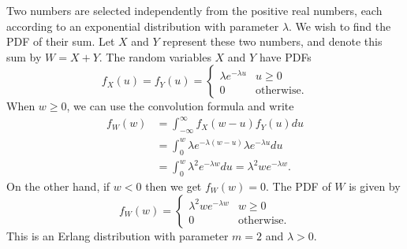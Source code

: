 \begin{example}
Two numbers are selected independently from the positive real numbers, each according to an exponential distribution with parameter $\lambda$. 
We wish to find the PDF of their sum.
Let $X$ and $Y$ represent these two numbers, and denote this sum by $W = X + Y$.
The random variables $X$ and $Y$ have PDFs
\begin{equation*}
f_X (u) = f_Y (u) = \begin{cases} \lambda e^{-\lambda u} & u \geq 0 \\
0 & \text{otherwise} . \end{cases}
\end{equation*}
When $w \geq 0$, we can use the convolution formula and write
\begin{equation*}
\begin{split}
f_W (w) &= \int_{-\infty}^{\infty} f_X(w - u) f_Y(u) du \\
&= \int_0^w \lambda e^{-\lambda(w - u)} \lambda e^{-\lambda u} du \\
&= \int_0^w \lambda^2 e^{-\lambda w} du
= \lambda^2 w e^{-\lambda w}.
\end{split}
\end{equation*}
On the other hand, if $w < 0$ then we get $f_W(w) = 0$.
The PDF of $W$ is given by
\begin{equation*}
f_W (w) = \begin{cases} \lambda^2 w e^{-\lambda w} & w \geq 0 \\
0 & \text{otherwise} . \end{cases}
\end{equation*}
This is an Erlang distribution with parameter $m = 2$ and $\lambda > 0$.
\end{example}

